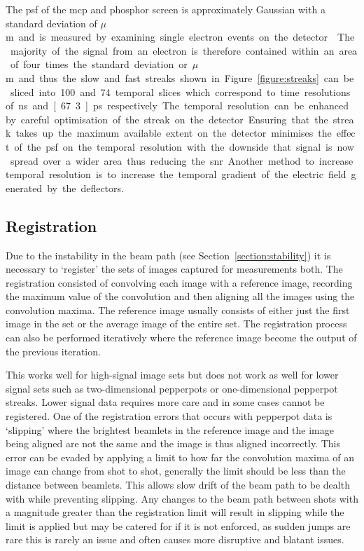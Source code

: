 The \gls{psf} of the \gls{mcp} and phosphor screen is approximately Gaussian with a standard deviation of \unit[35]{$\mu$m} and is measured by examining single electron events on the detector~\cite{rory_thesis}.
The majority of the signal from an electron is therefore contained within an area of four times the standard deviation or \unit[140]{$\mu$m} and thus the slow and fast streaks shown in Figure~\ref{figure:streaks} can be sliced into 100 and 74 temporal slices which correspond to time resolutions of \unit[143]{ns} and \unit[67.3]{ps} respectively.

The temporal resolution can be enhanced by careful optimisation of the streak on the detector.
Ensuring that the streak takes up the maximum available extent on the detector minimises the effect of the \gls{psf} on the temporal resolution with the downside that signal is now spread over a wider area thus reducing the \gls{snr}.
Another method to increase temporal resolution is to increase the temporal gradient of the electric field generated by the deflectors.

\subsection{Registration}\label{section:emittance_registration}
Due to the instability in the beam path (see Section~\ref{section:stability}) it is necessary to `register' the sets of images captured for measurements both.
The registration consisted of convolving each image with a reference image, recording the maximum value of the convolution and then aligning all the images using the convolution maxima.
The reference image usually consists of either just the first image in the set or the average image of the entire set.
The registration process can also be performed iteratively where the reference image become the output of the previous iteration.

This works well for high-signal image sets but does not work as well for lower signal sets such as two-dimensional pepperpots or one-dimensional pepperpot streaks.
Lower signal data requires more care and in some cases cannot be registered.
One of the registration errors that occurs with pepperpot data is `slipping' where the brightest beamlets in the reference image and the image being aligned are not the same and the image is thus aligned incorrectly.
This error can be evaded by applying a limit to how far the convolution maxima of an image can change from shot to shot, generally the limit should be less than the distance between beamlets.
This allows slow drift of the beam path to be dealth with while preventing slipping.
Any changes to the beam path between shots with a magnitude greater than the registration limit will result in slipping while the limit is applied but may be catered for if it is not enforced, as sudden jumps are rare this is rarely an issue and often causes more disruptive and blatant issues.

